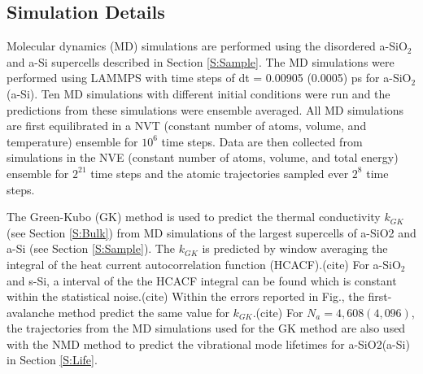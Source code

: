 \documentclass[aps,prb,twocolumn,superscriptaddress,footinbib,amsmath,amssymb,floatfix]{revtex4}
\begin{document}
\subsection{\label{S:Simulation}Simulation Details}

Molecular dynamics (MD) simulations are performed using the disordered 
a-SiO$_2$ and a-Si supercells described in 
Section \ref{S:Sample}. 
The MD simulations were performed using LAMMPS\cite{plimpton_fast_1995}  
with time steps of dt = 0.00905 (0.0005) ps for a-SiO$_2$(a-Si). 
Ten MD simulations with different initial conditions were run and 
the predictions from these simulations were ensemble averaged. 
All MD simulations are first equilibrated in a NVT (constant number 
of atoms, volume, and temperature) ensemble for $10^6$ 
time steps. Data are then collected from simulations
in the NVE (constant number of atoms, volume, and total
energy) ensemble 
for $2^{21}$ time steps and the atomic trajectories sampled 
ever $2^{8}$ time steps. 

The Green-Kubo (GK) method is used to predict the thermal 
conductivity $k_{GK}$ (see Section \ref{S:Bulk}) from MD simulations 
of the 
largest supercells of a-SiO2 and a-Si (see Section \ref{S:Sample}). The 
$k_{GK}$ is predicted by window averaging the integral of the heat current 
autocorrelation function (HCACF).(cite) 
For a-SiO$_2$ and s-Si, a 
interval of the the HCACF integral can be found which is constant 
within the statistical noise.(cite) Within the errors reported 
in Fig., the first-avalanche method predict the same value for  
$k_{GK}$.(cite)   
For $N_a=4,608 (4,096)$, the trajectories from the MD simulations 
used for the GK method are also used with the NMD method to predict 
the vibrational mode lifetimes for a-SiO2(a-Si) in 
Section \ref{S:Life}. 
\end{document}
